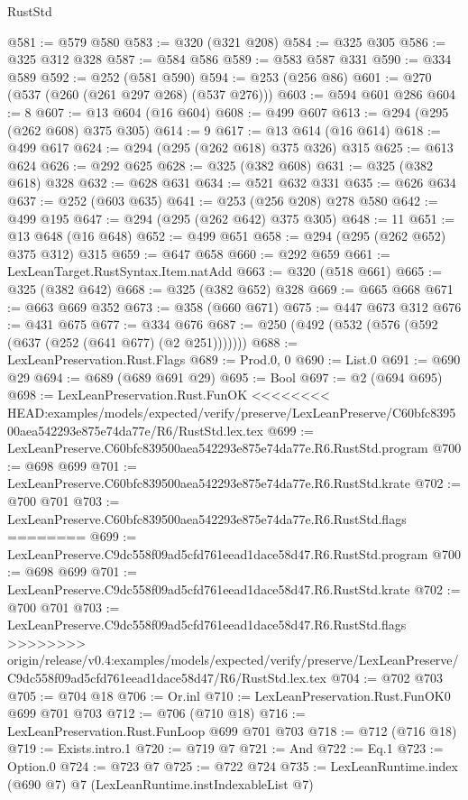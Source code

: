 \begin{lexlean}{RustStd}
\begin{coremodule}
{\begin{coremodule}
{{{{{{{{{{@581 := @579 @580
@583 := @320 (@321 @208)
@584 := @325 @305
@586 := @325 @312 @328
@587 := @584 @586
@589 := @583 @587 @331
@590 := @334 @589
@592 := @252 (@581 @590)
@594 := @253 (@256 @86)
@601 := @270 (@537 (@260 (@261 @297 @268) (@537 @276)))
@603 := @594 @601 @286
@604 := 8
@607 := @13 @604 (@16 @604)
@608 := @499 @607
@613 := @294 (@295 (@262 @608) @375 @305)
@614 := 9
@617 := @13 @614 (@16 @614)
@618 := @499 @617
@624 := @294 (@295 (@262 @618) @375 @326) @315
@625 := @613 @624
@626 := @292 @625
@628 := @325 (@382 @608)
@631 := @325 (@382 @618) @328
@632 := @628 @631
@634 := @521 @632 @331
@635 := @626 @634
@637 := @252 (@603 @635)
@641 := @253 (@256 @208) @278 @580
@642 := @499 @195
@647 := @294 (@295 (@262 @642) @375 @305)
@648 := 11
@651 := @13 @648 (@16 @648)
@652 := @499 @651
@658 := @294 (@295 (@262 @652) @375 @312) @315
@659 := @647 @658
@660 := @292 @659
@661 := LexLeanTarget.RustSyntax.Item.natAdd
@663 := @320 (@518 @661)
@665 := @325 (@382 @642)
@668 := @325 (@382 @652) @328
@669 := @665 @668
@671 := @663 @669 @352
@673 := @358 (@660 @671)
@675 := @447 @673 @312
@676 := @431 @675
@677 := @334 @676
@687 := @250 (@492 (@532 (@576 (@592 (@637 (@252 (@641 @677) (@2 @251)))))))
@688 := LexLeanPreservation.Rust.Flags
@689 := Prod.{0, 0}
@690 := List.{0}
@691 := @690 @29
@694 := @689 (@689 @691 @29)
@695 := Bool
@697 := @2 (@694 @695)
@698 := LexLeanPreservation.Rust.FunOK
<<<<<<<< HEAD:examples/models/expected/verify/preserve/LexLeanPreserve/C60bfc839500aea542293e875e74da77e/R6/RustStd.lex.tex
@699 := LexLeanPreserve.C60bfc839500aea542293e875e74da77e.R6.RustStd.program
@700 := @698 @699
@701 := LexLeanPreserve.C60bfc839500aea542293e875e74da77e.R6.RustStd.krate
@702 := @700 @701
@703 := LexLeanPreserve.C60bfc839500aea542293e875e74da77e.R6.RustStd.flags
========
@699 := LexLeanPreserve.C9dc558f09ad5cfd761eead1dace58d47.R6.RustStd.program
@700 := @698 @699
@701 := LexLeanPreserve.C9dc558f09ad5cfd761eead1dace58d47.R6.RustStd.krate
@702 := @700 @701
@703 := LexLeanPreserve.C9dc558f09ad5cfd761eead1dace58d47.R6.RustStd.flags
>>>>>>>> origin/release/v0.4:examples/models/expected/verify/preserve/LexLeanPreserve/C9dc558f09ad5cfd761eead1dace58d47/R6/RustStd.lex.tex
@704 := @702 @703
@705 := @704 @18
@706 := Or.inl
@710 := LexLeanPreservation.Rust.FunOK0 @699 @701 @703
@712 := @706 (@710 @18)
@716 := LexLeanPreservation.Rust.FunLoop @699 @701 @703
@718 := @712 (@716 @18)
@719 := Exists.intro.{1}
@720 := @719 @7
@721 := And
@722 := Eq.{1}
@723 := Option.{0}
@724 := @723 @7
@725 := @722 @724
@735 := LexLeanRuntime.index
    (@690 @7)
    @7
    (LexLeanRuntime.instIndexableList @7)
}}}}}}}}}}
\end{coremodule}}
\end{coremodule}
\end{lexlean}
